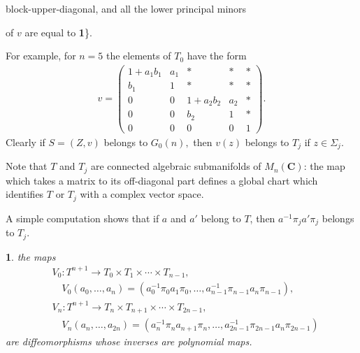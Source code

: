 \documentclass{surv-l}
\theoremstyle{plain}
\newtheorem{prop}[theorem]{\sc{Proposition}}
\theoremstyle{definition}
\numberwithin{equation}{chapter}
\begin{document}
\qquad \qquad block-upper-diagonal, and all the lower principal minors

\qquad \qquad \qquad \qquad \qquad \qquad \qquad \qquad \qquad\qquad\qquad of $v$ are equal to \textbf{1}\}.

For example, for $n=5$ the elements of $T_{0}$ have the form
\begin{align*}
v= \left(\begin{array}{ccccc}
1+a_{1}b_{1} & a_{1} & \ast & \ast & \ast\\
b_{1} & 1 & \ast & \ast & \ast\\
0 & 0 & 1+a_{2}b_{2} & a_{2} & \ast\\
0 & 0 & b_{2} & 1 & \ast\\
0 & 0 & 0 & 0 & 1
\end{array}\right).
\end{align*}
Clearly if $S=(Z, v)$ belongs to $G_{0}(n),$ then $v(z)$ belongs to $T_{j}$ if $z\in\Sigma_{j}$.

Note that $T$ and $T_{j}$ are connected algebraic submanifolds of $M_{n}(\textbf{C})$: the map which takes a matrix to its off-diagonal part defines a global chart which identifies $T$ or $T_{j}$ with a complex vector space.

A simple computation shows that if $a$ and $a'$ belong to $T$, then $a^{-1}\pi_{j}a'\pi_{j}$ belongs to $T_{j}$.
\renewcommand\thetheorem{25.5}
\setcounter{theorem}{0}
\begin{prop}\label{pro25.5}
the maps
\renewcommand\theequation{25.\arabic{equation}}
\setcounter{equation}{5}
\begin{align}\label{eq25.6}
& V_{0}:T^{n+1}\rightarrow T_{0}\times T_{1}\times\cdots \times T_{n-1}, \\
&\quad V_{0}(a_{0},\ldots,a_{n})=(a_{0}^{-1}\pi_{0}a_{1}\pi_{0}, \ldots,a_{n-1}^{-1}\pi_{n-1}a_{n}\pi_{n-1}),\nonumber\\
& V_{n}:T^{n+1}\rightarrow T_{n}\times T_{n+1}\times \cdots \times T_{2n-1},\\
&\quad V_{n}(a_{n},\ldots,a_{2n})=(a_{n}^{-1}\pi_{n}a_{n+1}\pi_{n},\ldots, a_{2n-1}^{-1}\pi_{2n-1}a_{n}\pi_{2n-1})\nonumber
\end{align}
are diffeomorphisms whose inverses are polynomial maps.
\end{prop}
\end{document}
